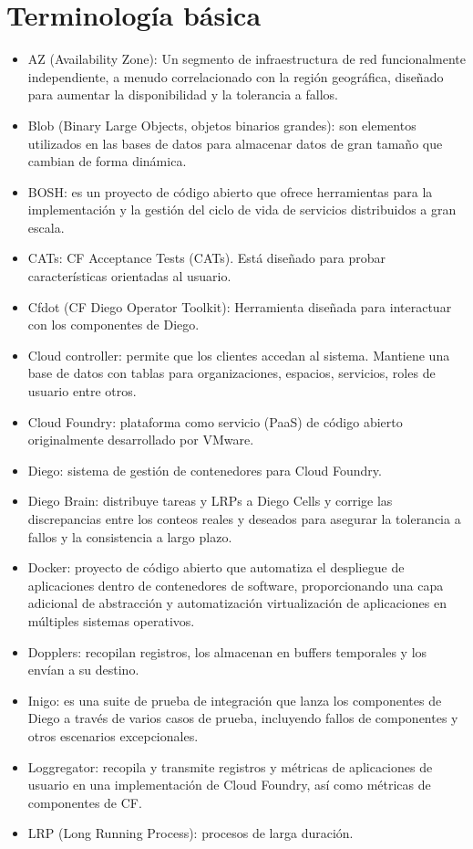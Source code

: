 \documentclass[a4paper,11pt]{article}
\begin{document}
\section{Terminología básica}
 \begin{itemize}
 \item	AZ (Availability Zone): Un segmento de infraestructura de red funcionalmente independiente, a menudo correlacionado con la región geográfica, diseñado para aumentar la disponibilidad y la tolerancia a fallos.
 \item	Blob (Binary Large Objects, objetos binarios grandes): son elementos utilizados en las bases de datos para almacenar datos de gran tamaño que cambian de forma dinámica.
 \item	BOSH: es un proyecto de código abierto que ofrece herramientas para la implementación y la gestión del ciclo de vida de servicios distribuidos a gran escala.
 \item	CATs: CF Acceptance Tests (CATs). Está diseñado para probar características orientadas al usuario.
 \item	Cfdot (CF Diego Operator Toolkit): Herramienta diseñada para interactuar con los componentes de Diego.
 \item	Cloud controller: permite que los clientes accedan al sistema. Mantiene una base de datos con tablas para organizaciones, espacios, servicios, roles de usuario entre otros.
 \item	Cloud Foundry:  plataforma como servicio (PaaS) de código abierto originalmente desarrollado por VMware.
 \item	Diego: sistema de gestión de contenedores para Cloud Foundry.
 \item	Diego Brain: distribuye tareas y LRPs a Diego Cells y corrige las discrepancias entre los conteos reales y deseados para asegurar la tolerancia a fallos y la consistencia a largo plazo.
 \item	Docker: proyecto de código abierto que automatiza el despliegue de aplicaciones dentro de contenedores de software, proporcionando una capa adicional de abstracción y automatización virtualización de aplicaciones en múltiples sistemas operativos.
 \item	Dopplers: recopilan registros, los almacenan en buffers temporales y los envían a su destino.
 \item	Inigo: es una suite de prueba de integración que lanza los componentes de Diego a través de varios casos de prueba, incluyendo fallos de componentes y otros escenarios excepcionales.
 \item	Loggregator: recopila y transmite registros y métricas de aplicaciones de usuario en una implementación de Cloud Foundry, así como métricas de componentes de CF.
 \item	LRP (Long Running Process): procesos de larga duración.
 \end{itemize}
\end{document}
